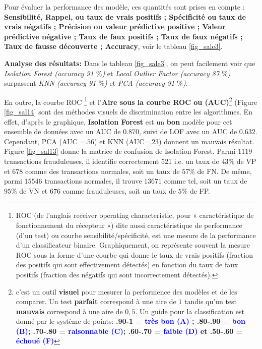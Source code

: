 Pour évaluer la performance des modèle, ces quantités sont prises en compte : \textbf{
Sensibilité, Rappel, ou taux de vrais positifs ; Spécificité ou taux de vrais négatifs ; Précision ou valeur prédictive positive ; Valeur prédictive négative ; Taux de faux positifs ; Taux de faux négatifs ; Taux de fausse découverte ; Accuracy}, voir le tableau \ref{fig_sale3}.

\noindent\textbf{Analyse des résultats:} Dans le tableau \eqref{fig_sale3}, on peut facilement voir que \textit{Isolation Forest (accuracy 91 $\%$)} et \textit{Local Outlier Factor (accuracy 87 $\%$)} surpassent \textit{KNN (accuracy 91 $\%$)} et \textit{PCA (accuracy 91 $\%$)}.

En outre, la courbe ROC \footnote{ROC (de l’anglais receiver operating characteristic, pour « caractéristique de fonctionnement du récepteur ») dite aussi caractéristique de performance (d'un test) ou courbe sensibilité/spécificité, est une mesure de la performance d'un classificateur binaire. Graphiquement, on représente souvent la mesure ROC sous la forme d'une courbe qui donne le taux de vrais positifs (fraction des positifs qui sont effectivement détectés) en fonction du taux de faux positifs (fraction des négatifs qui sont incorrectement détectés).} et l'\textbf{Aire sous la courbe ROC ou (AUC)}\footnote{c'est un outil \textbf{visuel} pour mesurer la performence  des modèles et de les comparer. Un test \textbf{parfait} correspond à une aire de $1$ tandis qu'un test \textbf{mauvais} correspond à une aire de $0,5$. Un guide pour la classification est donné par le système de points: \textbf{
.90-1 = \textcolor{blue}{très bon (A)} ; .80-.90 = \textcolor{blue}{bon (B)}; .70-.80 = \textcolor{blue}{raisonnable (C)}; .60-.70 = \textcolor{blue}{faible (D)} et .50-.60 = \textcolor{blue}{échoué (F)}}\cite{ROC}} (Figure \ref{fig_sal14}
sont des méthodes visuels de discrimination entre les algorithmes. En effet, d'après le graphique, \textbf{Isolation Forest} est un \textbf{bon} modèle pour cet ensemble de données avec un AUC de $0.870$, suivi de LOF avec un AUC de $0.632$. \noindent Cependant, PCA (AUC =$.56$) et KNN (AUC=$.23$) donnent un mauvais résultat. Figure \ref{fig_sal13} donne la matrice de confusion de Isolation Forest. Parmi $1119$ transactions frauduleuses, il identifie correctement $521$ i.e. un taux de $ 43 \%$ de VP et $678$ comme des transactions normales, soit un taux de $ 57 \%$ de  FN. De même, parmi $15546$ transactions normales, il trouve $13671$ comme tel, soit un taux de $95 \%$ de VN  et $676$ comme frauduleuses,  soit un taux de $5 \%$ de FP. 
